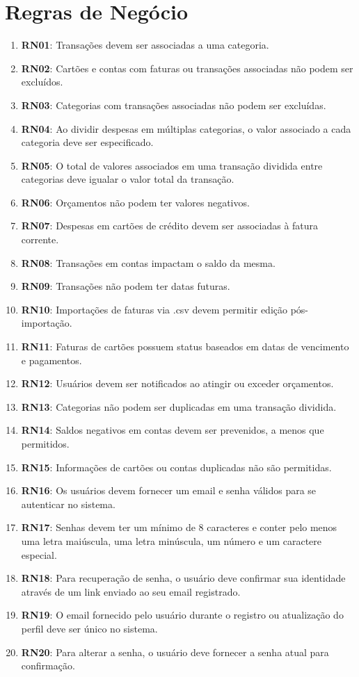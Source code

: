 \section{Regras de Negócio}
\begin{enumerate}
	\item \textbf{RN01}: Transações devem ser associadas a uma categoria.
	\item \textbf{RN02}: Cartões e contas com faturas ou transações associadas não podem ser excluídos.
	\item \textbf{RN03}: Categorias com transações associadas não podem ser excluídas.
	\item \textbf{RN04}: Ao dividir despesas em múltiplas categorias, o valor associado a cada categoria deve ser especificado.
	\item \textbf{RN05}: O total de valores associados em uma transação dividida entre categorias deve igualar o valor total da transação.
	\item \textbf{RN06}: Orçamentos não podem ter valores negativos.
	\item \textbf{RN07}: Despesas em cartões de crédito devem ser associadas à fatura corrente.
	\item \textbf{RN08}: Transações em contas impactam o saldo da mesma.
	\item \textbf{RN09}: Transações não podem ter datas futuras.
	\item \textbf{RN10}: Importações de faturas via .csv devem permitir edição pós-importação.
	\item \textbf{RN11}: Faturas de cartões possuem status baseados em datas de vencimento e pagamentos.
	\item \textbf{RN12}: Usuários devem ser notificados ao atingir ou exceder orçamentos.
	\item \textbf{RN13}: Categorias não podem ser duplicadas em uma transação dividida.
	\item \textbf{RN14}: Saldos negativos em contas devem ser prevenidos, a menos que permitidos.
	\item \textbf{RN15}: Informações de cartões ou contas duplicadas não são permitidas.
	\item \textbf{RN16}: Os usuários devem fornecer um email e senha válidos para se autenticar no sistema.
	\item \textbf{RN17}: Senhas devem ter um mínimo de 8 caracteres e conter pelo menos uma letra maiúscula, uma letra minúscula, um número e um caractere especial.
	\item \textbf{RN18}: Para recuperação de senha, o usuário deve confirmar sua identidade através de um link enviado ao seu email registrado.
	\item \textbf{RN19}: O email fornecido pelo usuário durante o registro ou atualização do perfil deve ser único no sistema.
	\item \textbf{RN20}: Para alterar a senha, o usuário deve fornecer a senha atual para confirmação.
\end{enumerate}

